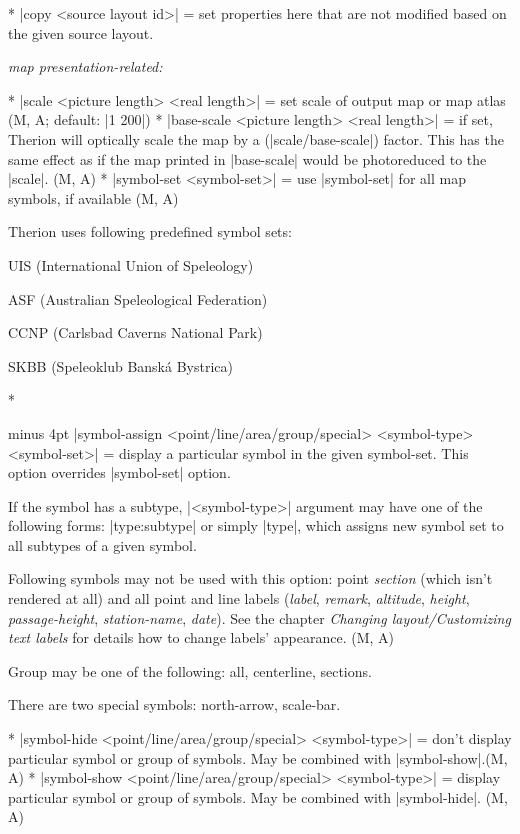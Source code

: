 \comopt 
  * |copy <source layout id>| = set properties here that are not
    modified based on the given source layout.
  
  {\it map presentation-related:}

  * |scale <picture length> <real length>| = set scale of
    output map or map atlas (M, A; default: |1 200|)
  * |base-scale <picture length> <real length>| = if set, Therion will
    optically scale the map by a (|scale/base-scale|) factor.
    This has the same effect as if the map printed in |base-scale| would be
    photoreduced to the |scale|. (M, A)
  * |symbol-set <symbol-set>| = use |symbol-set| for all map symbols,
    if available (M, A)
    
    Therion uses following predefined symbol sets:\par
    UIS (International Union of Speleology)\par
    ASF (Australian Speleological Federation)\par
    CCNP (Carlsbad Caverns National Park)\par
    SKBB (Speleoklub Bansk\'a Bystrica)
    
  * {\rightskip 0cm minus 4pt
    |symbol-assign <point/line/area/group/special> <symbol-type> <symbol-set>| = 
    display a
    particular symbol in the given symbol-set. This option overrides 
    |symbol-set| option.\par}
    
    If the symbol has a subtype, |<symbol-type>| argument may have one
    of the following forms: |type:subtype| or simply |type|, which
    assigns new symbol set to all subtypes of a given symbol.
    
    Following symbols may not be used with this option: point {\it section} 
    (which isn't rendered at all) and all point and line labels ({\it label}, 
    {\it remark}, {\it altitude}, {\it height}, {\it passage-height}, 
    {\it station-name}, {\it date}). See the chapter
    {\it Changing layout/Customizing text labels} for details how to change
    labels' appearance. (M, A)

    Group may be one of the following: all, centerline, sections.
    
    There are two special symbols: north-arrow, scale-bar.

  * |symbol-hide <point/line/area/group/special>  <symbol-type>| = don't display 
    particular symbol or group of symbols. 
    May be combined with |symbol-show|.(M, A)
  * |symbol-show <point/line/area/group/special> <symbol-type>| = display particular 
    symbol or group of symbols. May be combined with |symbol-hide|. (M, A)


